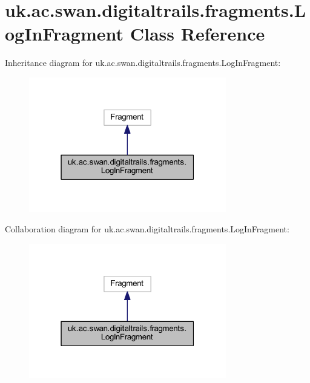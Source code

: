 \hypertarget{classuk_1_1ac_1_1swan_1_1digitaltrails_1_1fragments_1_1_log_in_fragment}{\section{uk.\+ac.\+swan.\+digitaltrails.\+fragments.\+Log\+In\+Fragment Class Reference}
\label{classuk_1_1ac_1_1swan_1_1digitaltrails_1_1fragments_1_1_log_in_fragment}
}


Inheritance diagram for uk.\+ac.\+swan.\+digitaltrails.\+fragments.\+Log\+In\+Fragment\+:\nopagebreak
\begin{figure}[H]
\begin{center}
\leavevmode
\includegraphics[width=244pt]{classuk_1_1ac_1_1swan_1_1digitaltrails_1_1fragments_1_1_log_in_fragment__inherit__graph}
\end{center}
\end{figure}


Collaboration diagram for uk.\+ac.\+swan.\+digitaltrails.\+fragments.\+Log\+In\+Fragment\+:\nopagebreak
\begin{figure}[H]
\begin{center}
\leavevmode
\includegraphics[width=244pt]{classuk_1_1ac_1_1swan_1_1digitaltrails_1_1fragments_1_1_log_in_fragment__coll__graph}
\end{center}
\end{figure}
